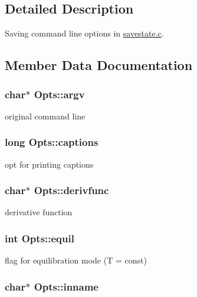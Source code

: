 \subsection{Detailed Description}
Saving command line options in \hyperlink{savestate_8c}{savestate.c}. 

\subsection{Member Data Documentation}
\hypertarget{structOpts_a2bcc37ebf3132c2b74b1cbc8456d4241}{
\subsubsection[{argv}]{\setlength{\rightskip}{0pt plus 5cm}char$\ast$ {\bf Opts::argv}}}
\label{structOpts_a2bcc37ebf3132c2b74b1cbc8456d4241}
original command line \hypertarget{structOpts_ab153e3d261a7b7daf5a566f25bf539a9}{
\subsubsection[{captions}]{\setlength{\rightskip}{0pt plus 5cm}long {\bf Opts::captions}}}
\label{structOpts_ab153e3d261a7b7daf5a566f25bf539a9}
opt for printing captions \hypertarget{structOpts_a2071490329894a70e89a365d741a9a23}{
\subsubsection[{derivfunc}]{\setlength{\rightskip}{0pt plus 5cm}char$\ast$ {\bf Opts::derivfunc}}}
\label{structOpts_a2071490329894a70e89a365d741a9a23}
derivative function \hypertarget{structOpts_a50f9595cc355bb8091848d039763518e}{
\subsubsection[{equil}]{\setlength{\rightskip}{0pt plus 5cm}int {\bf Opts::equil}}}
\label{structOpts_a50f9595cc355bb8091848d039763518e}
flag for equilibration mode (T = const) \hypertarget{structOpts_ad99220ebb24e6d311d853d8255a79e13}{
\subsubsection[{inname}]{\setlength{\rightskip}{0pt plus 5cm}char$\ast$ {\bf Opts::inname}}}
